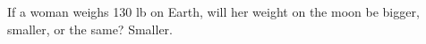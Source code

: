 {If a woman weighs 130 lb on Earth, will her weight on the moon be bigger, smaller, or the same?}
{Smaller.}
